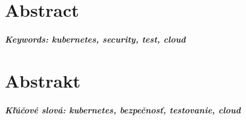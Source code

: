 \documentclass[12pt, oneside, openany]{book}
\begin{document}
\vfill\eject 



\newpage 
\thispagestyle{empty}
\chapter*{Abstract}\label{chap:abstract_en}


\paragraph*{Keywords: kubernetes, security, test, cloud}  


\newpage 
\thispagestyle{empty}
\chapter*{Abstrakt}\label{chap:abstract_sk}


\paragraph*{Kľúčové slová: kubernetes, bezpečnosť, testovanie, cloud}




\newpage 
\tableofcontents



\listoffigures
\listoftables
\newpage
{}
{}
\lstlistoflistings




\mainmatter




% 
% 

% 
% 







\backmatter

\nocite{*}





\end{document}

